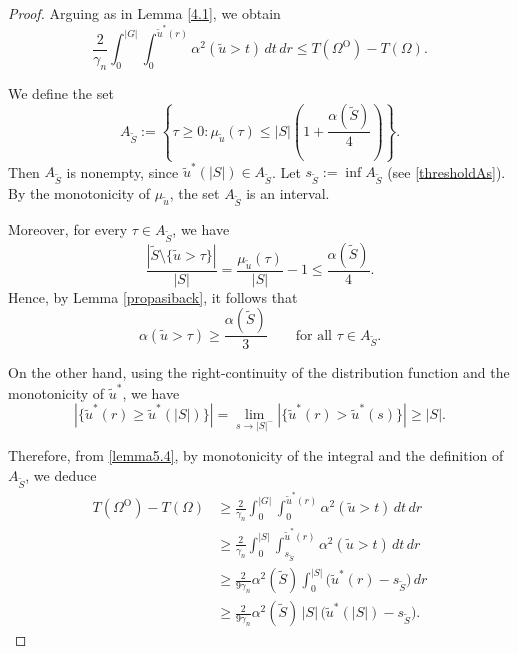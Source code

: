 \documentclass[oneside,a4paper,11pt,notitlepage]{article}
\theoremstyle{definition}
\theoremstyle{plain}
\theoremstyle{definition}
\begin{document}
\begin{proof}
Arguing as in Lemma \ref{4.1}, we obtain
\begin{equation}
\label{lemma5.4}
\frac{2}{\gamma_n}\int_{0}^{|G|}\int_0^{\tilde u^*(r)} \alpha^2(\tilde u>t)\,dt\,dr
\leq T(\Omega^{\mathrm{O}})-T(\Omega).
\end{equation}

We define the set
\begin{equation*}
A_{\tilde S}
:= \left\{ \tau \geq 0 : \mu_{\tilde u}(\tau)\leq |S|\left(1+\frac{\alpha(\tilde S)}{4}\right) \right\}.
\end{equation*}
Then $A_{\tilde S}$ is nonempty, since $\tilde u^*(|S|)\in A_{\tilde S}$. 
Let $s_{\tilde S}:=\inf A_{\tilde S}$ (see \eqref{thresholdAs}). 
By the monotonicity of $\mu_{\tilde u}$, the set $A_{\tilde S}$ is an interval.

Moreover, for every $\tau \in A_{\tilde S}$, we have
\begin{equation*}
\frac{|\tilde S \setminus \{\tilde u>\tau\}|}{|S|}
= \frac{\mu_{\tilde u}(\tau)}{|S|}-1
\leq \frac{\alpha(\tilde S)}{4}.
\end{equation*}
Hence, by Lemma \ref{propasiback}, it follows that
\begin{equation*}
\alpha(\tilde u>\tau)\geq \frac{\alpha(\tilde S)}{3}
\qquad \text{for all } \tau \in A_{\tilde S}.
\end{equation*}

On the other hand, using the right-continuity of the distribution function and the monotonicity of $\tilde u^*$, we have
\begin{equation*}
\left|\{\tilde u^*(r)\geq \tilde u^*(|S|)\}\right|
= \lim_{s\to |S|^-} \left|\{\tilde u^*(r) > \tilde u^*(s)\}\right|
\geq |S|.
\end{equation*}

Therefore, from \eqref{lemma5.4}, by monotonicity of the integral and the definition of $A_{\tilde S}$, we deduce
\begin{equation*}
\begin{aligned}
T(\Omega^{\mathrm{O}})-T(\Omega)
&\geq \frac{2}{\gamma_n}\int_0^{|G|}\int_0^{\tilde u^*(r)} \alpha^2(\tilde u>t)\,dt\,dr \\
&\geq \frac{2}{\gamma_n}\int_0^{|S|}\int_{s_{\tilde S}}^{\tilde u^*(r)} \alpha^2(\tilde u>t)\,dt\,dr \\
&\geq \frac{2}{9\gamma_n}\alpha^2(\tilde S)
\int_0^{|S|} \bigl(\tilde u^*(r)-s_{\tilde S}\bigr)\,dr \\
&\geq \frac{2}{9\gamma_n}\alpha^2(\tilde S)\,|S|\,
\bigl(\tilde u^*(|S|)-s_{\tilde S}\bigr).
\end{aligned}
\end{equation*}
\end{proof}
\end{document}
